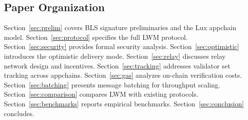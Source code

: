 \subsection{Paper Organization}

Section~\ref{sec:prelim} covers BLS signature preliminaries and the Lux appchain model. Section~\ref{sec:protocol} specifies the full LWM protocol. Section~\ref{sec:security} provides formal security analysis. Section~\ref{sec:optimistic} introduces the optimistic delivery mode. Section~\ref{sec:relay} discusses relay network design and incentives. Section~\ref{sec:tracking} addresses validator set tracking across appchains. Section~\ref{sec:gas} analyzes on-chain verification costs. Section~\ref{sec:batching} presents message batching for throughput scaling. Section~\ref{sec:comparison} compares LWM with existing protocols. Section~\ref{sec:benchmarks} reports empirical benchmarks. Section~\ref{sec:conclusion} concludes.

